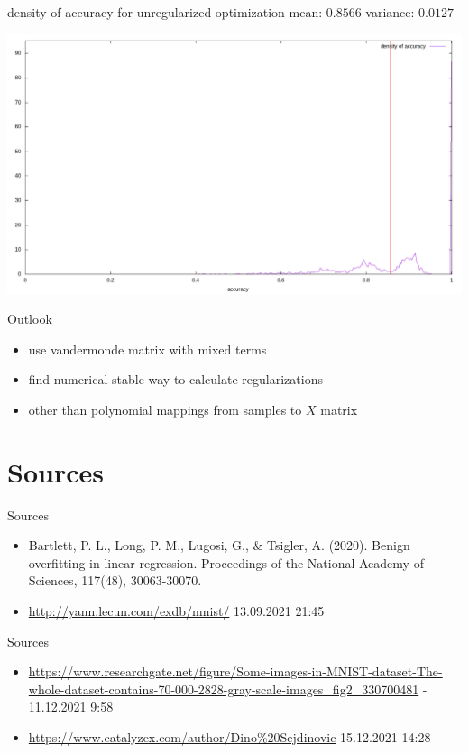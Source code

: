 \documentclass{beamer}
\begin{document}
\begin{frame}{density of accuracy for unregularized optimization}
mean: \(0.8566\) \hfill variance: \(0.0127\)
\begin{center}
	\includegraphics[width=\textwidth]{source/density.png}
\end{center}
\end{frame}

\begin{frame}{Outlook}
\begin{itemize}
	\item use vandermonde matrix with mixed terms
	\item find numerical stable way to calculate regularizations
	\item other than polynomial mappings from samples to \(X\) matrix
\end{itemize}
\end{frame}

\section{Sources}

\begin{frame}{Sources}
\tiny
\begin{itemize}
	\item Bartlett, P. L., Long, P. M., Lugosi, G., \& Tsigler, A. (2020). Benign overfitting in linear regression. Proceedings of the National Academy of Sciences, 117(48), 30063-30070.
	\item \url{http://yann.lecun.com/exdb/mnist/} 13.09.2021 21:45
\end{itemize}
\end{frame}

\begin{frame}{Sources}
\tiny
\begin{itemize}
	\item \url{https://www.researchgate.net/figure/Some-images-in-MNIST-dataset-The-whole-dataset-contains-70-000-2828-gray-scale-images_fig2_330700481} - 11.12.2021 9:58
	\item \url{https://www.catalyzex.com/author/Dino\%20Sejdinovic} 15.12.2021 14:28
\end{itemize}
\end{frame}
\end{document}

